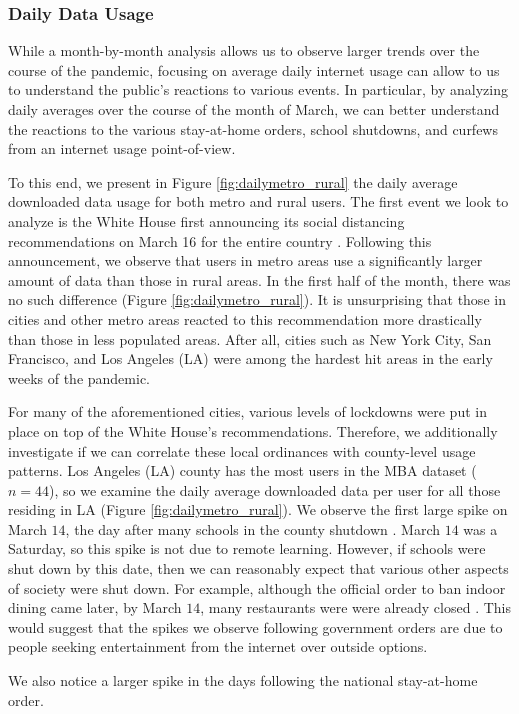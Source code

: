 \subsubsection{Daily Data Usage}
While a month-by-month analysis allows us to observe larger trends over the course of the pandemic, focusing on average daily internet usage can allow to us to understand the public's reactions to various events. In particular, by analyzing daily averages over the course of the month of March, we can better understand the reactions to the various stay-at-home orders, school shutdowns, and curfews from an internet usage point-of-view. 

To this end, we present in Figure \ref{fig:dailymetro_rural} the daily average downloaded data usage for both metro and rural users. The first event we look to analyze is the White House first announcing its social distancing recommendations on March 16 for the entire country \cite{trump2020coronavirus}. Following this announcement, we observe that users in metro areas use a significantly larger amount of data than those in rural areas. In the first half of the month, there was no such difference (Figure \ref{fig:dailymetro_rural}). It is unsurprising that those in cities and other metro areas reacted to this recommendation more drastically than those in less populated areas. After all, cities such as New York City, San Francisco, and Los Angeles (LA) were among the hardest hit areas in the early weeks of the pandemic. 

For many of the aforementioned cities, various levels of lockdowns were put in place on top of the White House's recommendations. Therefore, we additionally investigate if we can correlate these local ordinances with county-level usage patterns. Los Angeles (LA) county has the most users in the MBA dataset ($n=44$), so we examine the daily average downloaded data per user for all those residing in LA (Figure \ref{fig:dailymetro_rural}). We observe the first large spike on March $14$, the day after many schools in the county shutdown \cite{haire2020LA}. March $14$ was a Saturday, so this spike is not due to remote learning. However, if schools were shut down by this date, then we can reasonably expect that various other aspects of society were shut down. For example, although the official order to ban indoor dining came later, by March $14$, many restaurants were were already closed \cite{eater2020}. This would suggest that the spikes we observe following government orders are due to people seeking entertainment from the internet over outside options.

We also notice a larger spike in the days following the national stay-at-home order. 


